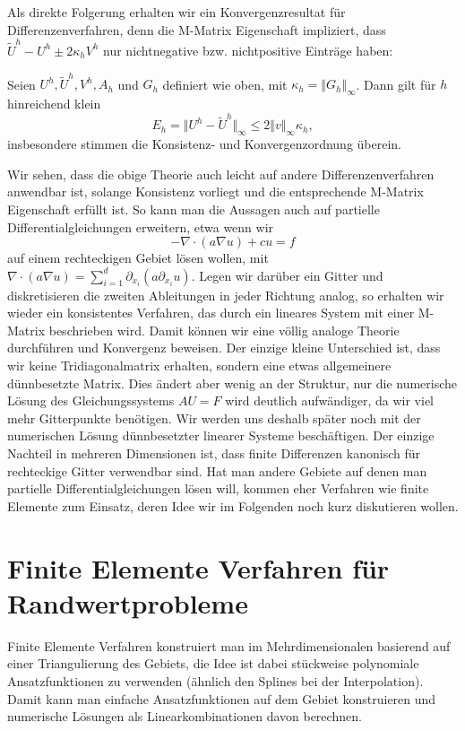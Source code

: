 Als direkte Folgerung erhalten wir ein  Konvergenzresultat f\"ur Differenzenverfahren, denn die M-Matrix Eigenschaft impliziert, dass $\tilde U^h - U^h\pm 2 \kappa_h V^h$ nur nichtnegative bzw. nichtpositive Eintr\"age haben:
\begin{theorem}{}{}
Seien $U^h, \tilde U^h, V^h, A_h$ und $G_h$ definiert wie oben, mit $\kappa_h = \Vert G_h  \Vert_\infty$.
Dann gilt f\"ur $h$ hinreichend klein
$$ E_h = \Vert U^h - \tilde U^h \Vert_\infty \leq 2 \Vert v \Vert_\infty  \kappa_h, $$
insbesondere stimmen die Konsistenz- und Konvergenzordnung \"uberein. 
\end{theorem} 
 
Wir sehen, dass die obige Theorie auch leicht auf andere Differenzenverfahren anwendbar ist, solange Konsistenz vorliegt und die entsprechende M-Matrix Eigenschaft erf\"ullt ist. So kann man die Aussagen auch auf partielle Differentialgleichungen erweitern, etwa wenn wir 
$$ - \nabla \cdot (a \nabla u ) + cu = f $$
auf einem rechteckigen Gebiet l\"osen wollen, mit $\nabla \cdot (a \nabla u ) = \sum_{i=1}^d \partial_{x_i} (a \partial_{x_i} u). $
Legen wir dar\"uber ein Gitter und diskretisieren die zweiten Ableitungen in jeder Richtung analog, so erhalten wir wieder ein konsistentes Verfahren, das durch ein lineares System mit einer M-Matrix beschrieben wird. Damit k\"onnen wir eine v\"ollig analoge Theorie durchf\"uhren und Konvergenz beweisen. Der einzige kleine Unterschied ist, dass wir keine Tridiagonalmatrix erhalten, sondern eine etwas allgemeinere d\"unnbesetzte Matrix. Dies \"andert aber wenig an der Struktur, nur die numerische L\"osung des Gleichungssystems $AU=F$ wird deutlich aufw\"andiger, da wir viel mehr Gitterpunkte ben\"otigen. Wir werden uns deshalb sp\"ater noch mit der numerischen L\"osung d\"unnbesetzter linearer Systeme besch\"aftigen.  Der einzige Nachteil in mehreren Dimensionen ist, dass finite Differenzen kanonisch f\"ur rechteckige Gitter verwendbar sind. Hat man andere Gebiete auf denen man partielle Differentialgleichungen l\"osen will, kommen eher Verfahren wie finite Elemente zum Einsatz, deren Idee wir im Folgenden noch kurz diskutieren wollen. 

\section{Finite Elemente Verfahren f\"ur Randwertprobleme} 

Finite Elemente Verfahren konstruiert man im Mehrdimensionalen basierend auf einer Triangulierung des Gebiets, die Idee ist dabei st\"uckweise polynomiale Ansatzfunktionen zu verwenden  (\"ahnlich den Splines bei der Interpolation). Damit kann man einfache Ansatzfunktionen auf dem Gebiet konstruieren und numerische L\"osungen als Linearkombinationen davon berechnen. 

